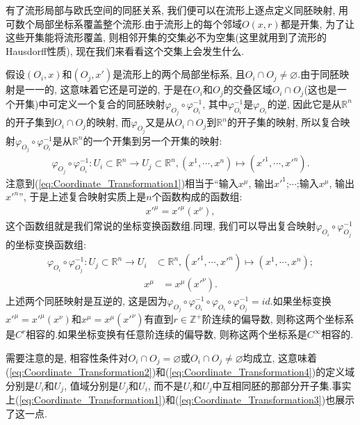 有了流形局部与欧氏空间的同胚关系, 我们便可以在流形上逐点定义同胚映射, 用可数个局部坐标系覆盖整个流形.由于流形上的每个邻域$O(x,r)$都是开集, 为了让这些开集能将流形覆盖, 则相邻开集的交集必不为空集(这里就用到了流形的Hausdorff性质), 现在我们来看看这个交集上会发生什么.

假设$(O_i,x)$和$(O_j,x')$是流形上的两个局部坐标系, 且$O_i\cap O_j\neq \varnothing$.由于同胚映射是一一的, 这意味着它还是可逆的, 于是在$O_i$和$O_j$的交叠区域$O_i\cap O_j$(这也是一个开集)中可定义一个复合的同胚映射$\varphi_{O_j}\circ \varphi^{-1}_{O_i}$, 其中$\varphi^{-1}_{O_i}$是$\varphi_{O_i}$的逆, 因此它是从$\mathbb{R}^n$的开子集到$O_i\cap O_j$的映射, 而$\varphi_{O_j}$又是从$O_i\cap O_j$到$\mathbb{R}^n$的开子集的映射, 所以复合映射$\varphi_{O_j}\circ \varphi^{-1}_{O_i}$是从$\mathbb{R}^n$的一个开集到另一个开集的映射:
\begin{equation}\label{eq:Coordinate_Transformation1}
  \begin{split}
    \varphi_{O_j}\circ \varphi^{-1}_{O_i}:U_i\subset\mathbb{R}^n\rightarrow U_j\subset\mathbb{R}^n,(x^1,\cdots,x^n)\mapsto (x'^1,\cdots,x'^n).
  \end{split}
\end{equation}
注意到(\ref{eq:Coordinate_Transformation1})相当于“输入$x^\mu$, 输出$x'^1$;$\cdots$;输入$x^\mu$, 输出$x'^n$”, 于是上述复合映射实质上是$n$个函数构成的函数组:
\begin{equation}\label{eq:Coordinate_Transformation2}
  \begin{split}
    x'^\mu=x'^\mu(x^\nu),
  \end{split}
\end{equation}
这个函数组就是我们常说的坐标变换函数组.同理, 我们可以导出复合映射$\varphi_{O_i}\circ \varphi^{-1}_{O_j}$的坐标变换函数组:
\begin{equation}\label{eq:Coordinate_Transformation3}
  \begin{split}
    \varphi_{O_i}\circ \varphi^{-1}_{O_j}:U_j\subset\mathbb{R}^n\rightarrow U_i&\subset\mathbb{R}^n,(x'^1,\cdots,x'^n)\mapsto (x^1,\cdots,x^n);
  \end{split}
\end{equation}
\begin{equation}\label{eq:Coordinate_Transformation4}
  \begin{split}
    x^\mu&=x^\mu(x'^\nu).
  \end{split}
\end{equation}
上述两个同胚映射是互逆的, 这是因为$\varphi_{O_j}\circ \varphi^{-1}_{O_i}\circ \varphi_{O_i}\circ \varphi^{-1}_{O_j}=id$.如果坐标变换$x'^\mu=x'^\mu(x^\nu)$和$x^\mu=x^\mu(x'^\nu)$有直到$r\in\mathbb{Z}^+$阶连续的偏导数, 则称这两个坐标系是$C^r$相容的.如果坐标变换有任意阶连续的偏导数, 则称这两个坐标系是$C^\infty$相容的.
\begin{remark}
  需要注意的是, 相容性条件对$O_i\cap O_j=\varnothing$或$O_i\cap O_j\neq \varnothing$均成立, 这意味着(\ref{eq:Coordinate_Transformation2})和(\ref{eq:Coordinate_Transformation4})的定义域分别是$U_i$和$U_j$, 值域分别是$U_j$和$U_i$, 而不是$U_i$和$U_j$中互相同胚的那部分开子集.事实上(\ref{eq:Coordinate_Transformation1})和(\ref{eq:Coordinate_Transformation3})也展示了这一点.
\end{remark}

